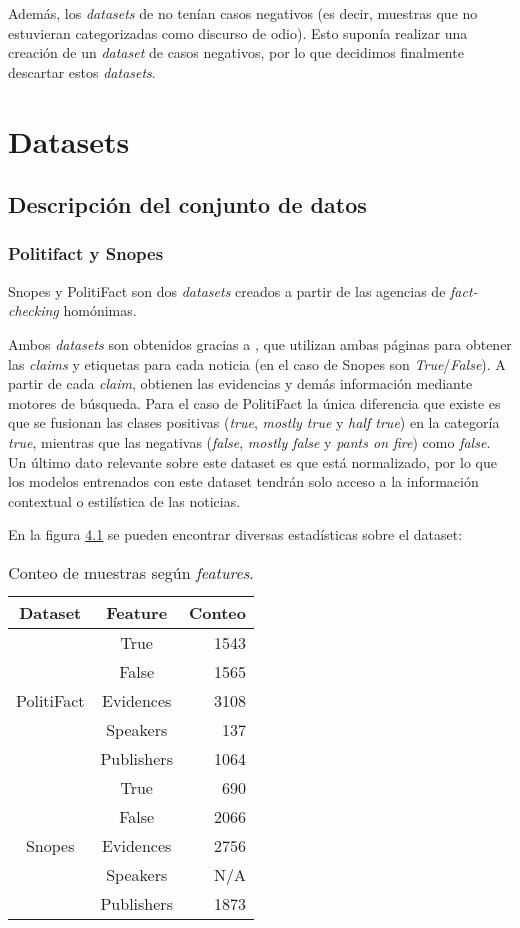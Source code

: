 Además, los \textit{datasets} de \citet{Abilov2021,Szpakowski2017} no tenían casos negativos (es decir, muestras que no estuvieran categorizadas como discurso de odio). Esto suponía realizar una creación de un \textit{dataset} de casos negativos, por lo que decidimos finalmente descartar estos \textit{datasets}.


\section{Datasets}

\subsection{Descripción del conjunto de datos}

\subsubsection{Politifact y Snopes}

Snopes \citep{Popat2017} y PolitiFact \citep{Vlachos2014} son dos \textit{datasets} creados a partir de las agencias de \textit{fact-checking} homónimas.

Ambos \textit{datasets} son obtenidos gracias a \citet{Xu2022}, que utilizan ambas páginas para obtener las \textit{claims} y etiquetas para cada noticia (en el caso de Snopes son \textit{True}/\textit{False}). A partir de cada \textit{claim}, obtienen las evidencias y demás información mediante motores de búsqueda. Para el caso de PolitiFact la única diferencia que existe es que se fusionan las clases positivas (\textit{true}, \textit{mostly true} y \textit{half true}) en la categoría \textit{true}, mientras que las negativas (\textit{false}, \textit{mostly false} y \textit{pants on fire}) como \textit{false}. Un último dato relevante sobre este dataset es que está normalizado, por lo que los modelos entrenados con este dataset tendrán solo acceso a la información contextual o estilística de las noticias.

En la figura \hyperref[tab:sp-dataset]{4.1} se pueden encontrar diversas estadísticas sobre el dataset: 
\begin{table}[H]
\centering
\begin{tabular}{ccr}
\hline
\textbf{Dataset} & \textbf{Feature} & \textbf{Conteo} \\ \hline
\multirow{5}{*}{PolitiFact} & True & 1543 \\
 & False & 1565 \\
 & Evidences & 3108 \\
 & Speakers & 137 \\
 & Publishers & 1064 \\ \hline
\multirow{5}{*}{Snopes} & True & 690 \\ \
 & False & 2066 \\
 & Evidences & 2756 \\
 & Speakers & N/A \\
 & Publishers & 1873 \\ \hline
\end{tabular}
\caption{Conteo de muestras según \textit{features}.}
\label{tab:sp-dataset}
\end{table}


